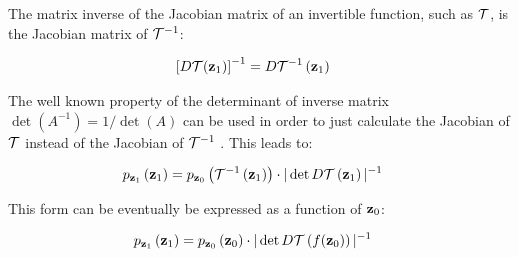 The matrix inverse of the Jacobian matrix of an invertible function, such as $\mathcal{T}$,
is the Jacobian matrix of $\mathcal{T}^{-1}$: \cite{inverse-function-theorem}
    
\begin{align}
\left[D\mathcal{T}(\mathbf{z}_{1})\right]^{-1} &= D\mathcal{T}^{-1}\left(\mathbf{z}_{1}\right)
\end{align}

The well known property of the determinant of inverse matrix $\det(A^{-1})= 1/\det(A)$
can be used in order to just calculate the Jacobian of $\mathcal{T}$ instead of the Jacobian of $\mathcal{T}^{-1}$
. This leads to:

\begin{align}
p_{\mathbf{z}_{1}}\left(\mathbf{z}_{1}\right) &= p_{\mathbf{z}_{0}}\left(\mathcal{T}^{-1}\left(\mathbf{z}_{1}\right)\right)\cdot |\det D\mathcal{T}\left(\mathbf{z}_{1}\right)|^{-1}
\end{align}

This form can be eventually be expressed as a function of $\mathbf{z}_{0}$:

\begin{align}
p_{\mathbf{z}_{1}}\left(\mathbf{z}_{1}\right) &= p_{\mathbf{z}_{0}}\left(\mathbf{z}_{0}\right)\cdot |\det D\mathcal{T}\left(f(\mathbf{z}_{0})\right)|^{-1}
\end{align}
